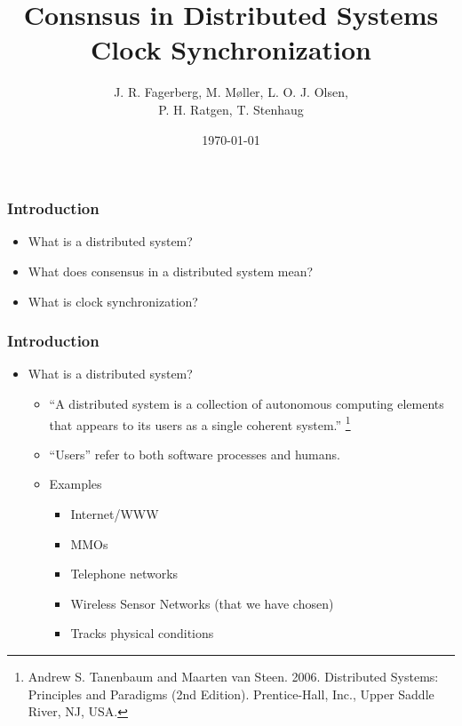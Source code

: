 \documentclass{beamer}
\title{Consnsus in Distributed Systems \\ Clock Synchronization}
\author{J. R. Fagerberg, M. Møller, L. O. J. Olsen,\\ P. H. Ratgen, T. Stenhaug}
\institute{IMADA}
\date{\today}
\begin{document}
 
\frame{\titlepage}

\begin{frame}
  \frametitle{Introduction}
  \begin{itemize}
  \item What is a distributed system?
  \item What does consensus in a distributed system mean?
  \item What is clock synchronization?
  \end{itemize}
\end{frame}
 
\begin{frame}
  \frametitle{Introduction}
  \begin{itemize}
  \item<1-> What is a distributed system?
    \begin{itemize}
    \item<2-> ``A distributed system is a collection of autonomous
      computing elements that appears to its users as a single
      coherent system.'' \footnote{Andrew S. Tanenbaum and Maarten van
        Steen. 2006. Distributed Systems: Principles and Paradigms
        (2nd Edition). Prentice-Hall, Inc., Upper Saddle River, NJ,
        USA.}
    \item<3-> ``Users'' refer to both software processes and humans.
    \item<4-> Examples
      \begin{itemize}
      \item<5-> Internet/WWW
      \item<6-> MMOs
      \item<7-> Telephone networks
      \item<8-> Wireless Sensor Networks (that we have chosen)
      \item<9-> Tracks physical conditions
      \end{itemize}
    \end{itemize}
  \end{itemize}
\end{frame}
\end{document}
